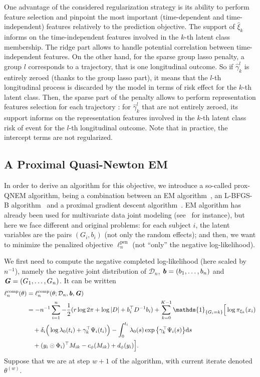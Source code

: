 \documentclass[11pt]{article}
\newcommand{\dd}{\mathrm{d}}
\newcommand{\ind}[1]{\mathds{1}_{#1}}
\newcommand{\cD}{\mathcal D}
\begin{document}
One advantage of the considered regularization strategy is its ability to perform feature selection and pinpoint the most important (time-dependent and time-independent) features relatively to the prediction objective. The support of $\hat \xi_k$ informs on the time-independent features involved in the $k$-th latent class membership. The ridge part allows to handle potential correlation between time-independent features.
On the other hand, for the sparse group lasso penalty, a group $l$ corresponds to a trajectory, that is one longitudinal outcome. So if $\hat \gamma_k^l$ is entirely zeroed (thanks to the group lasso part), it means that the $l$-th longitudinal process is discarded by the model in terms of risk effect for the $k$-th latent class.
Then, the sparse part of the penalty allows to perform representation features selection for each trajectory : for $\hat \gamma_k^l$ that are not entirely zeroed, its support informs on the representation features involved in the $k$-th latent class risk of event for the $l$-th longitudinal outcome.
Note that in practice, the intercept terms are not regularized.

\subsection{A Proximal Quasi-Newton EM}
\label{sec:prox-QNEM}

In order to derive an algorithm for this objective, we introduce a so-called prox-QNEM algorithm, being a combination between an EM algorithm~\citep{dempster1977maximum}, an L-BFGS-B algorithm~\citep{zhu1997algorithm} and a proximal gradient descent algorithm~\citep{beck2009fast}. EM algorithm has already been used for multivariate data joint modeling (see~\citet{lin2002maximum} for instance), but here we face different and original problems: for each subject $i$, the latent variables are the pairs $(G_i, b_i)$ (not only the random effects); and then, we want to minimize the penalized objective $\ell_n^\text{pen}$ (not ``only'' the negative log-likelihood).

We first need to compute the negative completed log-likelihood (here scaled by $n^{-1}$), namely the negative joint distribution of $\cD_n$, $\textbf{\textit{b}} = (b_1, \ldots, b_n)$ and $\textbf{\textit{G}} = (G_1, \ldots, G_n)$.
It can be written
\begin{align*}
  \ell_n^\text{comp}(\theta) &= \ell_n^\text{comp}(\theta ; \cD_n, \textbf{\textit{b}}, \textbf{\textit{G}}) \\ 
  &= - n^{-1} \sum_{i=1}^n -\dfrac12 (r \log 2\pi + \log|D| + b_i^\top D^{-1}b_i) + \sum_{k=0}^{K-1} \ind{\{G_i=k\}} \Big[ \log \pi_{\xi_k}(x_i) \\ 
  & \quad + \delta_i \Big(\log \lambda_0(t_i) + \gamma_k^\top \Psi_i(t_i) \Big) - \int_0^{t_i} \lambda_0(s) \exp \big\{ \gamma_k^\top \Psi_i(s) \big\} \dd s \\
  & \quad + (y_i \odot \Phi_i)^\top M_{ik} - c_\phi(M_{ik}) + d_\phi(y_i) \Big].
\end{align*}
Suppose that we are at step $w + 1$ of the algorithm, with current iterate denoted $\theta^{(w)}$. 
\end{document}
